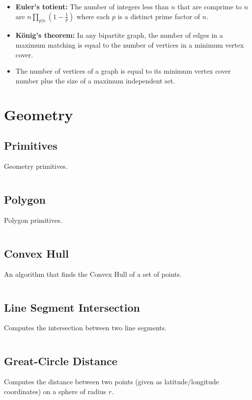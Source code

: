 \documentclass[9pt,a4paper,twocolumn,landscape,oneside]{amsart}
\newcommand{\code}[1]{\inputminted{cpp}{_code/#1}}
\begin{document}
\begin{itemize}
            \item \textbf{Euler's totient:} The number of integers less than
                $n$ that are comprime to $n$ are $n\prod_{p|n}\left(1 - \frac{1}{p}\right)$
                where each $p$ is a distinct prime factor of $n$.
            \item \textbf{König's theorem:} In any bipartite graph, the number
                of edges in a maximum matching is equal to the number of
                vertices in a minimum vertex cover.
            \item The number of vertices of a graph is equal to its minimum
                vertex cover number plus the size of a maximum independent set.
        \end{itemize}


\section{Geometry}
    \subsection{Primitives}
        Geometry primitives.
        \code{geometry/primitives.cpp}

    \subsection{Polygon}
        Polygon primitives.
        \code{geometry/polygon.cpp}

    \subsection{Convex Hull}
        An algorithm that finds the Convex Hull of a set of points.
        \code{geometry/convex_hull.cpp}

    \subsection{Line Segment Intersection}
        Computes the intersection between two line segments.
        \code{geometry/line_segment_intersect.cpp}

    \subsection{Great-Circle Distance}
        Computes the distance between two points (given as latitude/longitude
        coordinates) on a sphere of radius $r$.
        \code{geometry/gc_distance.cpp}
\end{document}
